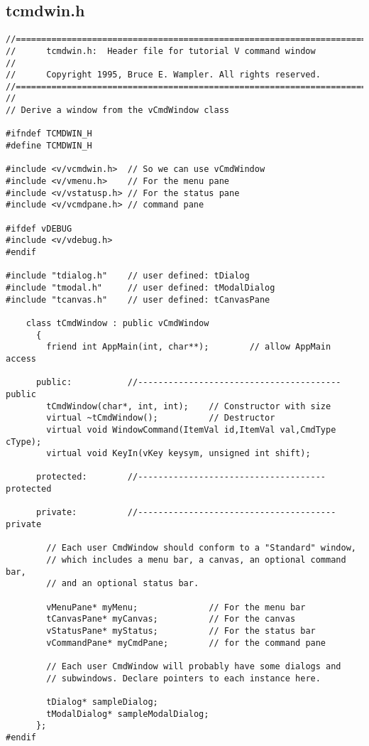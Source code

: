 \subsection*{tcmdwin.h}
%
\footnotesize
\begin{verbatim}
//========================================================================
//      tcmdwin.h:  Header file for tutorial V command window
//
//      Copyright 1995, Bruce E. Wampler. All rights reserved.
//========================================================================
//
// Derive a window from the vCmdWindow class

#ifndef TCMDWIN_H
#define TCMDWIN_H

#include <v/vcmdwin.h>  // So we can use vCmdWindow
#include <v/vmenu.h>    // For the menu pane
#include <v/vstatusp.h> // For the status pane
#include <v/vcmdpane.h> // command pane

#ifdef vDEBUG
#include <v/vdebug.h>
#endif

#include "tdialog.h"    // user defined: tDialog
#include "tmodal.h"     // user defined: tModalDialog
#include "tcanvas.h"    // user defined: tCanvasPane

    class tCmdWindow : public vCmdWindow
      {
        friend int AppMain(int, char**);        // allow AppMain access

      public:           //---------------------------------------- public
        tCmdWindow(char*, int, int);    // Constructor with size
        virtual ~tCmdWindow();          // Destructor
        virtual void WindowCommand(ItemVal id,ItemVal val,CmdType cType);
        virtual void KeyIn(vKey keysym, unsigned int shift);

      protected:        //------------------------------------- protected

      private:          //--------------------------------------- private

        // Each user CmdWindow should conform to a "Standard" window,
        // which includes a menu bar, a canvas, an optional command bar,
        // and an optional status bar.

        vMenuPane* myMenu;              // For the menu bar
        tCanvasPane* myCanvas;          // For the canvas
        vStatusPane* myStatus;          // For the status bar
        vCommandPane* myCmdPane;        // for the command pane

        // Each user CmdWindow will probably have some dialogs and
        // subwindows. Declare pointers to each instance here.

        tDialog* sampleDialog;
        tModalDialog* sampleModalDialog;
      };
#endif
\end{verbatim}
\normalfont\normalsize


